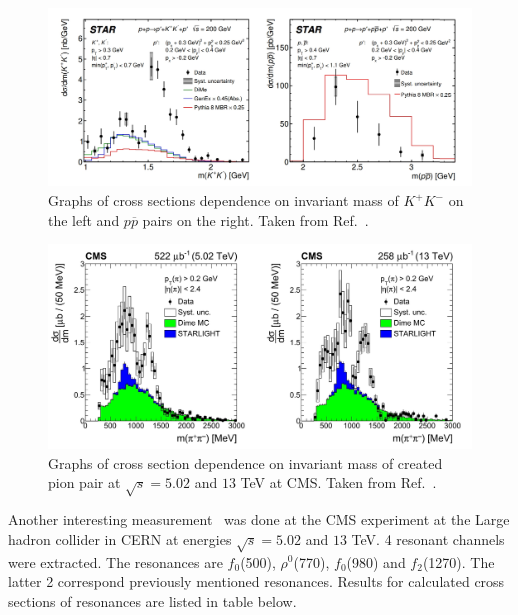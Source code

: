 \FloatBarrier
\begin{figure}[ht]
    \centering
    \includegraphics[width=1\textwidth]{figures/raphalkp.jpg}
    \caption[Graphs of cross section dependence on invariant mass of $K^+ K^-$ and $p \overline{p}$ pairs at STAR]{Graphs of cross sections dependence on invariant mass of $K^+K^-$ on the left and $p \overline{p}$ pairs on the right. Taken from Ref.~\cite{Rafal20}.}
    \label{tf8}
\end{figure}
\FloatBarrier
\begin{figure}[ht]
    \centering
    \includegraphics[width=1\textwidth]{figures/CMS.jpg}
    \caption[Cross section dependence on invariant mass of $\pi^+ \pi^-$ pairs at CMS]{Graphs of cross section dependence on invariant mass of created pion pair at $\sqrt{s}=5.02$ and $13$ TeV at CMS. Taken from Ref.~\cite{Sirunyan_2020}.}
    \label{tf8}
\end{figure}
\FloatBarrier
Another interesting measurement~\cite{Sirunyan_2020} was done at the CMS experiment at the Large hadron collider in CERN at energies $\sqrt{s} = 5.02$ and $13$ TeV. 4 resonant channels were extracted. The resonances are $f_0$(500), $\rho^0$(770), $f_0$(980) and $f_2$(1270). The latter 2 correspond previously mentioned resonances. Results for calculated cross sections of resonances are listed in table below.
\FloatBarrier
